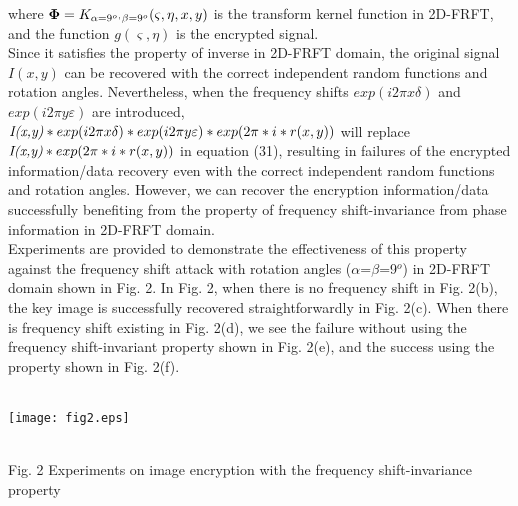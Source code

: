 \documentclass[journal]{IEEEtran}
\begin{document}
where ${\bf{\Phi }}={K_{\alpha  = {9^o}^,\beta  = {9^o}}}(\varsigma  ,\eta , x , y )$ is the transform kernel function in 2D-FRFT, and the function $g(\varsigma  ,\eta )$ is the encrypted signal.\\\indent Since it satisfies the property of inverse in 2D-FRFT domain, the original signal \emph{$I(x,y)$} can be recovered with the correct independent random functions and rotation angles. Nevertheless, when the frequency shifts $exp(i 2\pi x \delta )$ and $ exp(i 2\pi y \varepsilon)$ are introduced, $\emph{I(x,y)}* exp(i 2\pi x \delta ) * exp(i 2\pi y \varepsilon)* exp(2\pi  * i * r(x,y))$ will replace $\emph{I(x,y)} * exp(2\pi  * i * r(x,y))$ in equation (31), resulting in failures of the encrypted information/data recovery even with the correct independent random functions and rotation angles. However, we can recover the encryption information/data successfully benefiting from the property of frequency shift-invariance from phase information in 2D-FRFT domain.\\\indent Experiments are provided to demonstrate the effectiveness of this property against the frequency shift attack with rotation angles ($\alpha$=$\beta$=9$^o$) in 2D-FRFT domain shown in Fig. 2. In Fig. 2, when there is no frequency shift in Fig. 2(b), the key image is successfully recovered straightforwardly in Fig. 2(c). When there is frequency shift existing in Fig. 2(d), we see the failure without using the frequency shift-invariant property shown in Fig. 2(e), and the success using the property shown in Fig. 2(f). \\\
\centerline{\texttt{[image: fig2.eps]}}\\ { {Fig. 2 Experiments on image encryption with the frequency shift-invariance property}}
\end{document}
